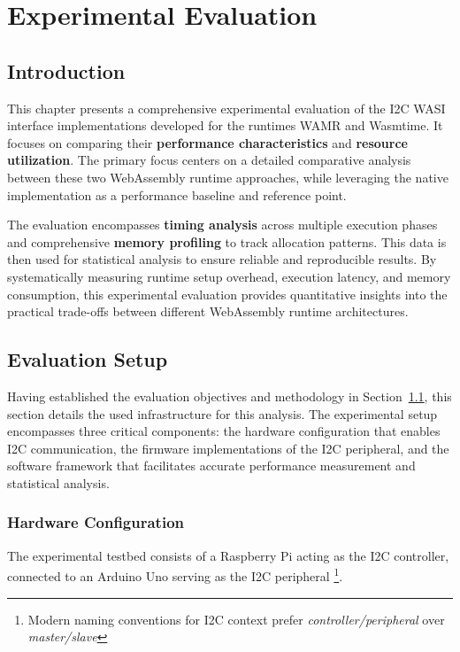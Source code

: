 \chapter{Experimental Evaluation}
\label{chap:eval}

\section{Introduction}
\label{sec:eval-intro}

This chapter presents a comprehensive experimental evaluation of the I2C WASI interface implementations developed for the runtimes WAMR and Wasmtime. It focuses on comparing their \textbf{performance characteristics} and \textbf{resource utilization}. The primary focus centers on a detailed comparative analysis between these two WebAssembly runtime approaches, while leveraging the native implementation as a performance baseline and reference point.

The evaluation encompasses \textbf{timing analysis} across multiple execution phases and comprehensive \textbf{memory profiling} to track allocation patterns. This data is then used for statistical analysis to ensure reliable and reproducible results. By systematically measuring runtime setup overhead, execution latency, and memory consumption, this experimental evaluation provides quantitative insights into the practical trade-offs between different WebAssembly runtime architectures.

\section{Evaluation Setup}
\label{sec:eval-methodology}

Having established the evaluation objectives and methodology in Section~\ref{sec:eval-intro}, this section details the used infrastructure for this analysis. The experimental setup encompasses three critical components: the hardware configuration that enables I2C communication, the firmware implementations of the I2C peripheral, and the software framework that facilitates accurate performance measurement and statistical analysis.

\subsection{Hardware Configuration}
\label{subsec:eval-setup-hw}

The experimental testbed consists of a Raspberry Pi acting as the I2C controller, connected to an Arduino Uno serving as the I2C peripheral \footnote{Modern naming conventions for I2C context prefer \textit{controller/peripheral} over \textit{master/slave}}.

